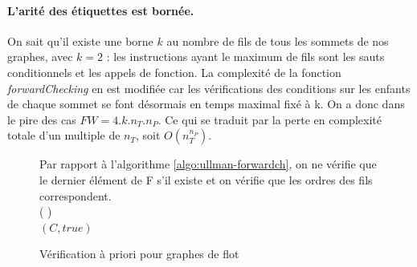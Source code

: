 \paragraph{L'arité des étiquettes est bornée.}
On sait qu'il existe une borne $k$ au nombre de fils de tous les sommets de nos graphes, avec $k=2$ : les instructions ayant le maximum de fils sont les sauts conditionnels et les appels de fonction.
La complexité de la fonction \emph{forwardChecking} en est modifiée car les vérifications des conditions sur les enfants de chaque sommet se font désormais en temps maximal fixé à k. On a donc dans le pire des cas $FW=4.k.n_T.n_P$. Ce qui se traduit par la perte en complexité totale d'un
multiple de $n_T$, soit $O(n_T^{n_P})$.

\begin{figure}
\begin{algorithm}[H] %
\caption{Vérification à priori pour graphes de flot}
\SetAlgoLined
Par rapport à l'algorithme \ref{algo:ullman-forwardch}, on ne vérifie que le dernier élément de F s'il existe et on vérifie que les ordres des fils correspondent.\\
\Fn(
){}{
\\
\Return $(C, true)$
}
\label{algo:ullman-forwardch-site}
\end{algorithm}
\end{figure}

